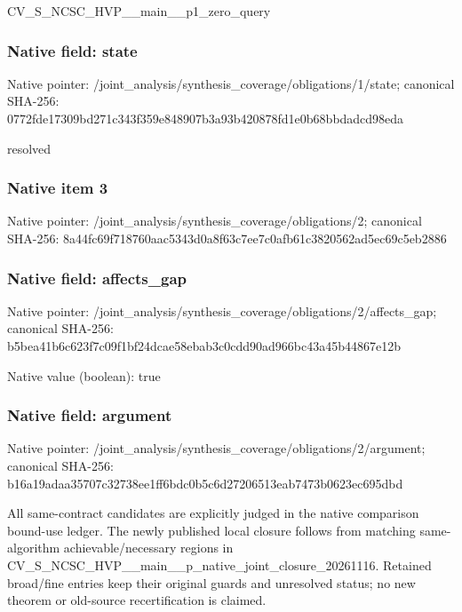 \documentclass[10pt,a4paper]{article}
\begin{document}
\begingroup\raggedright\sloppy CV\_\allowbreak{}S\_\allowbreak{}NCSC\_\allowbreak{}HVP\_\allowbreak{}\_\allowbreak{}main\_\allowbreak{}\_\allowbreak{}p1\_\allowbreak{}zero\_\allowbreak{}query\par\endgroup

\subsubsection{Native field: state}
Native pointer: /joint\_\allowbreak{}analysis/synthesis\_\allowbreak{}coverage/obligations/1/state; canonical SHA-256: 0772fde17309bd271c343f359e848907b3a93b420878fd1e0b68bbdadcd98eda

\begingroup\raggedright\sloppy resolved\par\endgroup

\subsubsection{Native item 3}
Native pointer: /joint\_\allowbreak{}analysis/synthesis\_\allowbreak{}coverage/obligations/2; canonical SHA-256: 8a44fc69f718760aac5343d0a8f63c7ee7c0afb61c3820562ad5ec69c5eb2886

\subsubsection{Native field: affects\_\allowbreak{}gap}
Native pointer: /joint\_\allowbreak{}analysis/synthesis\_\allowbreak{}coverage/obligations/2/affects\_\allowbreak{}gap; canonical SHA-256: b5bea41b6c623f7c09f1bf24dcae58ebab3c0cdd90ad966bc43a45b44867e12b

Native value (boolean): true

\subsubsection{Native field: argument}
Native pointer: /joint\_\allowbreak{}analysis/synthesis\_\allowbreak{}coverage/obligations/2/argument; canonical SHA-256: b16a19adaa35707c32738ee1ff6bdc0b5c6d27206513eab7473b0623ec695dbd

\begingroup\raggedright\sloppy All same-contract candidates are explicitly judged in the native comparison bound-use ledger. The newly published local closure follows from matching same-algorithm achievable/\allowbreak{}necessary regions in CV\_\allowbreak{}S\_\allowbreak{}NCSC\_\allowbreak{}HVP\_\allowbreak{}\_\allowbreak{}main\_\allowbreak{}\_\allowbreak{}p\_\allowbreak{}native\_\allowbreak{}joint\_\allowbreak{}closure\_\allowbreak{}20261116. Retained broad/\allowbreak{}fine entries keep their original guards and unresolved status;\allowbreak{} no new theorem or old-source recertification is claimed.\par\endgroup
\end{document}

